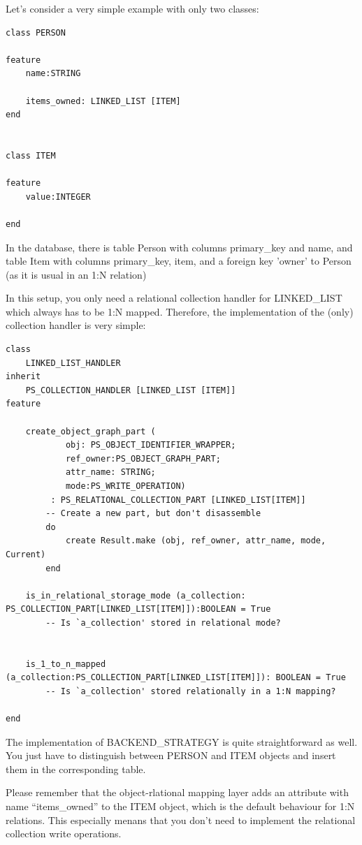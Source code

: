 Let's consider a very simple example with only two classes:

\begin{lstlisting}[language=OOSC2Eiffel, captionpos=b, caption={Example classes}, label={lst:example_application}]
class PERSON

feature
	name:STRING

	items_owned: LINKED_LIST [ITEM]
end


class ITEM

feature
	value:INTEGER

end
\end{lstlisting}

In the database, there is table Person with columns primary\_key and name, and table Item with columns primary\_key, item, and a foreign key 'owner' to Person (as it is usual in an 1:N relation)


In this setup, you only need a relational collection handler for LINKED\_LIST which always has to be 1:N mapped.
Therefore, the implementation of the (only) collection handler is very simple:

\begin{lstlisting}[language=OOSC2Eiffel, captionpos=b, caption={The collection handler for LINKED\_LIST}, label={lst:my_linked_list_collection_handler}]
class 
	LINKED_LIST_HANDLER
inherit
	PS_COLLECTION_HANDLER [LINKED_LIST [ITEM]]
feature

	create_object_graph_part (
			obj: PS_OBJECT_IDENTIFIER_WRAPPER;
			ref_owner:PS_OBJECT_GRAPH_PART; 
			attr_name: STRING;
			mode:PS_WRITE_OPERATION)
		 : PS_RELATIONAL_COLLECTION_PART [LINKED_LIST[ITEM]]
		-- Create a new part, but don't disassemble
		do
			create Result.make (obj, ref_owner, attr_name, mode, Current)
		end

	is_in_relational_storage_mode (a_collection: PS_COLLECTION_PART[LINKED_LIST[ITEM]]):BOOLEAN = True
		-- Is `a_collection' stored in relational mode?


	is_1_to_n_mapped (a_collection:PS_COLLECTION_PART[LINKED_LIST[ITEM]]): BOOLEAN = True
		-- Is `a_collection' stored relationally in a 1:N mapping?

end
\end{lstlisting}


The implementation of BACKEND\_STRATEGY is quite straightforward as well.
You just have to distinguish between PERSON and ITEM objects and insert them in the corresponding table.

Please remember that the object-rlational mapping layer adds an attribute with name ``items\_owned'' to the ITEM object, which is the default behaviour for 1:N relations.
This especially menans that you don't need to implement the relational collection write operations.

